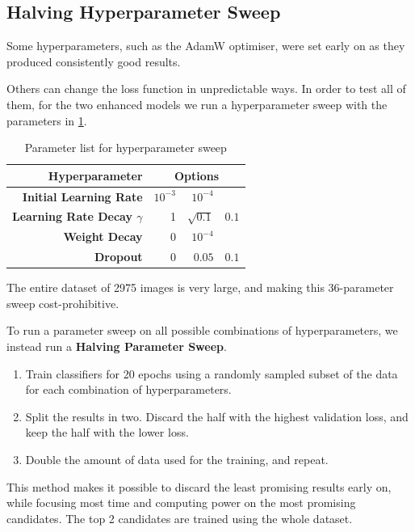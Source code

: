 \subsection{Halving Hyperparameter Sweep}
\label{param_sweep_section}
Some hyperparameters, such as the AdamW optimiser, were set early on as they produced consistently good results.

Others can change the loss function in unpredictable ways.
In order to test all of them, for the two enhanced models we run a hyperparameter sweep with the parameters in \cref{hyperparameter_list}.

\begin{table}[h]
	\centering
	\small
	\begin{tabular}{>{\bfseries}r | r r r}
		\toprule
		Hyperparameter & \multicolumn{3}{c}{Options} \\
		\midrule
		Initial Learning Rate & $10^{-3}$ & $10^{-4}$ & \\
		Learning Rate Decay $\gamma$ & 1 & $\sqrt{0.1}$ & $0.1$ \\
		\lt{} Weight Decay & $0$ & $10^{-4}$ & \\
		Dropout & 0 & $0.05$ & $0.1$ \\
		\bottomrule
	\end{tabular}
	\caption{Parameter list for hyperparameter sweep}
	\label{hyperparameter_list}
\end{table}

The entire dataset of 2975 images is very large, and making this 36-parameter sweep cost-prohibitive.

To run a parameter sweep on all possible combinations of hyperparameters, we instead run a \textbf{Halving Parameter Sweep}\cite{halving_param_sweep}.
\begin{enumerate}
	\item Train classifiers for 20 epochs using a randomly sampled subset of the data for each combination of hyperparameters.
	\item Split the results in two. Discard the half with the highest validation loss, and keep the half with the lower loss.
	\item Double the amount of data used for the training, and repeat.
\end{enumerate}

This method makes it possible to discard the least promising results early on, while focusing most time and computing power on the most promising candidates.
The top 2 candidates are trained using the whole dataset.


